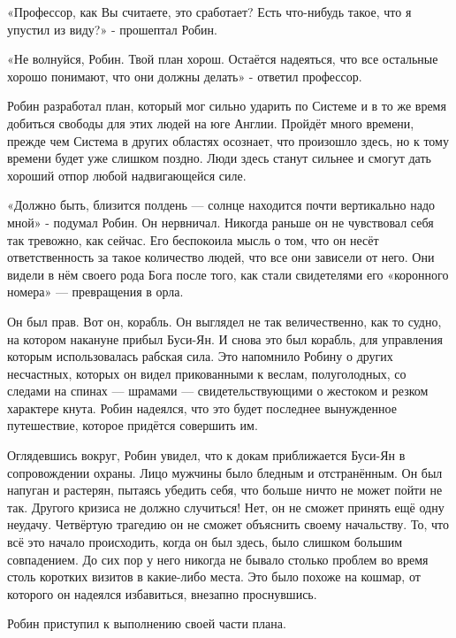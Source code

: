 \documentclass[a4paper,12pt]{book}
\begin{document}
\par
«Профессор, как Вы считаете, это сработает? Есть что-нибудь такое, что я упустил из виду?» - прошептал Робин.
\par
«Не волнуйся, Робин. Твой план хорош. Остаётся надеяться, что все остальные хорошо понимают, что они должны делать» - ответил профессор.\\
\par
Робин разработал план, который мог сильно ударить по Системе и в то же время добиться свободы для этих людей на юге Англии. Пройдёт много времени, прежде чем Система в других областях осознает, что произошло здесь, но к тому времени будет уже слишком поздно. Люди здесь станут сильнее и смогут дать хороший отпор любой надвигающейся силе.
\par
«Должно быть, близится полдень — солнце находится почти вертикально надо мной» - подумал Робин. Он нервничал. Никогда раньше он не чувствовал себя так тревожно, как сейчас. Его беспокоила мысль о том, что он несёт ответственность за такое количество людей, что все они зависели от него. Они видели в нём своего рода Бога после того, как стали свидетелями его «коронного номера» — превращения в орла.\\
\par
Он был прав. Вот он, корабль. Он выглядел не так величественно, как то судно, на котором накануне прибыл Буси-Ян. И снова это был корабль, для управления которым использовалась рабская сила. Это напомнило Робину о других несчастных, которых он видел прикованными к веслам, полуголодных, со следами на спинах — шрамами — свидетельствующими о жестоком и резком характере кнута. Робин надеялся, что это будет последнее вынужденное путешествие, которое придётся совершить им.
\par
Оглядевшись вокруг, Робин увидел, что к докам приближается Буси-Ян в сопровождении охраны. Лицо мужчины было бледным и отстранённым. Он был напуган и растерян, пытаясь убедить себя, что больше ничто не может пойти не так. Другого кризиса не должно случиться! Нет, он не сможет принять ещё одну неудачу. Четвёртую трагедию он не сможет объяснить своему начальству. То, что всё это начало происходить, когда он был здесь, было слишком большим совпадением. До сих пор у него никогда не бывало столько проблем во время столь коротких визитов в какие-либо места. Это было похоже на кошмар, от которого он надеялся избавиться, внезапно проснувшись.\\
\par
Робин приступил к выполнению своей части плана.
\par
\end{document}

